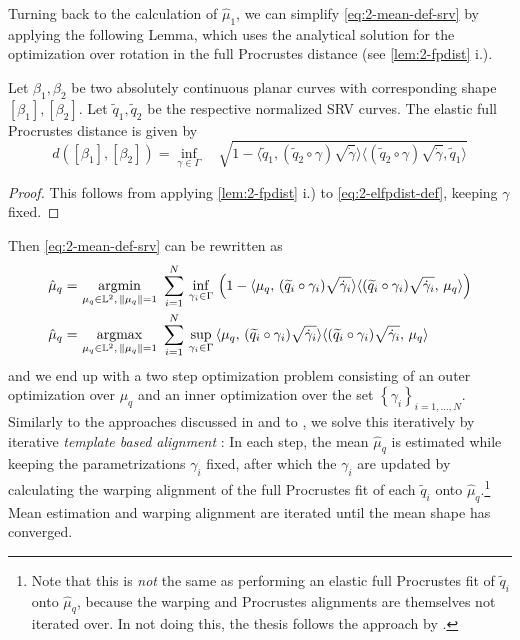 Turning back to the calculation of $\hat\mu_1$, we can simplify \cref{eq:2-mean-def-srv} by applying the following Lemma, which uses the analytical solution for the optimization over rotation in the full Procrustes distance (see \cref{lem:2-fpdist} i.). 

\begin{lemma}
  \label{lem:2-elfpdist}
  Let $\beta_1, \beta_2$ be two absolutely continuous planar curves with corresponding shape $[\beta_1], [\beta_2]$. Let $\widetilde q_1, \widetilde q_2$ be the respective normalized SRV curves.
  The elastic full Procrustes distance is given by
  \begin{equation}
    d([\beta_1],[\beta_2]) = \inf_{\gamma \in \Gamma} \quad \sqrt{ 1 - \langle \widetilde q_1, ( \widetilde q_2 \circ \gamma) \sqrt{\dot\gamma} \rangle \langle (\widetilde q_2 \circ \gamma) \sqrt{\dot\gamma}, \widetilde q_1 \rangle }
  \end{equation}
  \begin{proof}
    This follows from applying \cref{lem:2-fpdist} i.) to \cref{eq:2-elfpdist-def}, keeping $\gamma$ fixed.
  \end{proof}
\end{lemma}

\noindent Then \cref{eq:2-mean-def-srv} can be rewritten as
\begin{align}
  \hat\mu_q = &\, \operatorname*{argmin}_{\mu_q \in \mathbb{L}^2,\,\lVert\mu_q\rVert = 1}\,\,
    \sum_{i=1}^N \,\inf_{\gamma_i \in \Gamma}\, \left(1 - \langle \mu_q,\,(\widetilde q_i \circ \gamma_i) \sqrt{\dot\gamma_i} \rangle \langle (\widetilde q_i \circ \gamma_i) \sqrt{\dot\gamma_i},\, \mu_q\rangle \right) \\
  \hat\mu_q = &\, \operatorname*{argmax}_{\mu_q \in \mathbb{L}^2,\,\lVert\mu_q\rVert = 1}\,\,
    \sum_{i=1}^N \,\sup_{\gamma_i \in \Gamma}\, \langle \mu_q,\,(\widetilde q_i \circ \gamma_i) \sqrt{\dot\gamma_i} \rangle \langle (\widetilde q_i \circ \gamma_i) \sqrt{\dot\gamma_i},\, \mu_q\rangle\,
\end{align}
and we end up with a two step optimization problem consisting of an outer optimization over $\mu_q$ and an inner optimization over the set $\left\{\gamma_i\right\}_{i=1,\dots,N}$.
Similarly to the approaches discussed in \cite{SrivastavaKlassen2016} and to \cite{Steyer2021}, we solve this iteratively by iterative \emph{template based alignment} \parencite[see e.g.][271]{SrivastavaKlassen2016}:
In each step, the mean $\hat\mu_q$ is estimated while keeping the parametrizations $\gamma_i$ fixed, after which the $\gamma_i$ are updated by calculating the warping alignment of the full Procrustes fit of each $\widetilde q_i$ onto $\hat\mu_q$.\footnote{Note that this is \emph{not} the same as performing an elastic full Procrustes fit of $\widetilde q_i$ onto $\hat \mu_q$, because the warping and Procrustes alignments are themselves not iterated over. In not doing this, the thesis follows the approach by \citeauthor{SrivastavaEtAl2011}.}
Mean estimation and warping alignment are iterated until the mean shape has converged.

